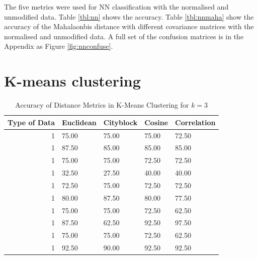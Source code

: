 \documentclass[a4paper, 10pt, conference]{ieeeconf}
\begin{document}
The five metrics were used for NN classification with the normalised and unmodified data. Table \ref{tbl:nn} shows the accuracy. Table \ref{tbl:nnmaha} show the accuracy of the Mahalaonbis distance with different covariance matrices with the normalised and unmodified data. A full set of the confusion matrices is in the Appendix as Figure \ref{fig:nnconfuse}.

\section{K-means clustering}

\begin{table}[!ht]
\centering
\caption{Accuracy of Distance Metrics in K-Means Clustering for $k = 3$}
\label{tbl:k3}
\begin{tabular}{|r|llll|}
\hline
\textbf{Type of Data} & \textbf{Euclidean} & \textbf{Cityblock} & \textbf{Cosine} & \textbf{Correlation} \\ \hline
1 & 75.00 & 75.00 & 75.00 & 72.50\\
1 & 87.50 & 85.00 & 85.00 & 85.00\\
1 & 75.00 & 75.00 & 72.50 & 72.50\\
1 & 32.50 & 27.50 & 40.00 & 40.00\\
1 & 72.50 & 75.00 & 72.50 & 72.50\\
1 & 80.00 & 87.50 & 80.00 & 77.50\\
1 & 75.00 & 75.00 & 72.50 & 62.50\\
1 & 87.50 & 62.50 & 92.50 & 97.50\\
1 & 75.00 & 75.00 & 72.50 & 62.50\\
1 & 92.50 & 90.00 & 92.50 & 92.50\\ \hline
\end{tabular}
\end{table}
\end{document}
